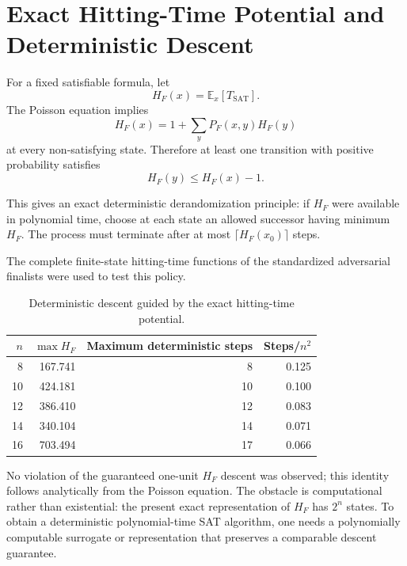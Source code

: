 \section{Exact Hitting-Time Potential and Deterministic Descent}
\label{sec:h-derandomization}

For a fixed satisfiable formula, let
\begin{equation}
H_F(x)=\mathbb E_x[T_{\mathrm{SAT}}].
\end{equation}
The Poisson equation implies
\begin{equation}
H_F(x)
=
1+\sum_yP_F(x,y)H_F(y)
\end{equation}
at every non-satisfying state.  Therefore at least one transition with positive
probability satisfies
\begin{equation}
\boxed{
H_F(y)\le H_F(x)-1.
}
\end{equation}

This gives an exact deterministic derandomization principle: if $H_F$ were
available in polynomial time, choose at each state an allowed successor having
minimum $H_F$.  The process must terminate after at most
$\lceil H_F(x_0)\rceil$ steps.

The complete finite-state hitting-time functions of the standardized
adversarial finalists were used to test this policy.

\begin{table}[t]
\centering
\caption{Deterministic descent guided by the exact hitting-time potential.}
\begin{tabular}{rrrr}
\toprule
$n$ & $\max H_F$ & Maximum deterministic steps & Steps/$n^2$ \\
\midrule
8 & 167.741 & 8 & 0.125 \\
10 & 424.181 & 10 & 0.100 \\
12 & 386.410 & 12 & 0.083 \\
14 & 340.104 & 14 & 0.071 \\
16 & 703.494 & 17 & 0.066 \\
\bottomrule
\end{tabular}
\end{table}

No violation of the guaranteed one-unit $H_F$ descent was observed; this
identity follows analytically from the Poisson equation.  The obstacle is
computational rather than existential: the present exact representation of
$H_F$ has $2^n$ states.  To obtain a deterministic polynomial-time SAT
algorithm, one needs a polynomially computable surrogate or representation
that preserves a comparable descent guarantee.
